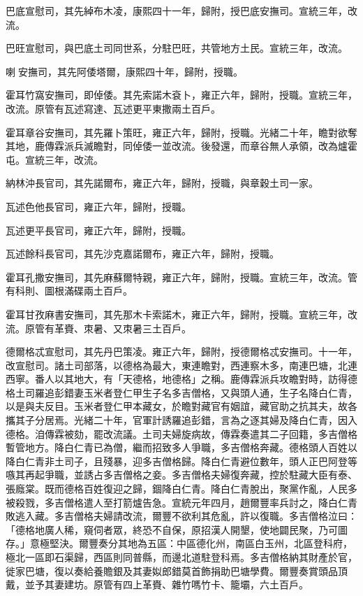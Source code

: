 \begin{pinyinscope}
巴底宣慰司，其先綽布木凌，康熙四十一年，歸附，授巴底安撫司。宣統三年，改流。

巴旺宣慰司，與巴底土司同世系，分駐巴旺，共管地方土民。宣統三年，改流。

喇安撫司，其先阿倭塔爾，康熙四十年，歸附，授職。

霍耳竹窩安撫司，即倬倭。其先索諾木袞卜，雍正六年，歸附，授職。宣統三年，改流。原管有瓦述寫達、瓦述更平東撒兩土百戶。

霍耳章谷安撫司，其先羅卜策旺，雍正六年，歸附，授職。光緒二十年，瞻對欲奪其地，鹿傳霖派兵滅瞻對，同倬倭一並改流。後發還，而章谷無人承領，改為爐霍屯。宣統三年，改流。

納林沖長官司，其先諾爾布，雍正六年，歸附，授職，與章穀土司一家。

瓦述色他長官司，雍正六年，歸附，授職。

瓦述更平長官司，雍正六年，歸附，授職。

瓦述餘科長官司，其先沙克嘉諾爾布，雍正六年，歸附，授職。

霍耳孔撒安撫司，其先麻蘇爾特親，雍正六年，歸附，授職。宣統三年，改流。管有科則、圖根滿碟兩土百戶。

霍耳甘孜麻書安撫司，其先那木卡索諾木，雍正六年，歸附，授職。宣統三年，改流。原管有革賚、朿暑、又朿暑三土百戶。

德爾格忒宣慰司，其先丹巴策凌。雍正六年，歸附，授德爾格忒安撫司。十一年，改宣慰司。諸土司部落，以德格為最大，東連瞻對，西連察木多，南連巴塘，北連西寧。番人以其地大，有「天德格，地德格」之稱。鹿傳霖派兵攻瞻對時，訪得德格土司羅追彭錯妻玉米者登仁甲生子名多吉僧格，又與頭人通，生子名降白仁青，以是與夫反目。玉米者登仁甲本藏女，於瞻對藏官有姻誼，藏官助之抗其夫，故各攜其子分居焉。光緒二十年，官軍計誘羅追彭錯，言為之逐其婦及降白仁青，因入德格。洎傳霖被劾，罷改流議。土司夫婦旋病故，傳霖奏遣其二子回籍，多吉僧格暫管地方。降白仁青已為僧，繼而招致多人爭職，多吉僧格奔藏。德格頭人百姓以降白仁青非土司子，且殘暴，迎多吉僧格歸。降白仁青避位數年，頭人正巴阿登等嗾其再起爭職，並誘占多吉僧格之妾。多吉僧格夫婦復奔藏，控於駐藏大臣有泰、張廕棠。既而德格百姓復迎之歸，錮降白仁青。降白仁青脫出，聚黨作亂，人民多被殺戮，多吉僧格遣人至打箭爐告急。宣統元年四月，趙爾豐率兵討之，降白仁青敗逃入藏。多吉僧格夫婦請改流，爾豐不欲利其危亂，許以復職。多吉僧格泣曰：「德格地廣人稀，窺伺者眾，終恐不自保，原招漢人開墾，使地闢民聚，乃可圖存。」意極堅決。爾豐奏分其地為五區：中區德化州，南區白玉州，北區登科府，極北一區即石渠歸，西區則同普縣，而邊北道駐登科焉。多吉僧格納其財產於官，徙家巴塘，復以奏給養贍銀及其妻姒郎錯莫首飾捐助巴塘學費。爾豐奏賞頭品頂戴，並予其妻建坊。原管有四上革賚、雜竹嗎竹卡、籠壩，六土百戶。


\end{pinyinscope}
